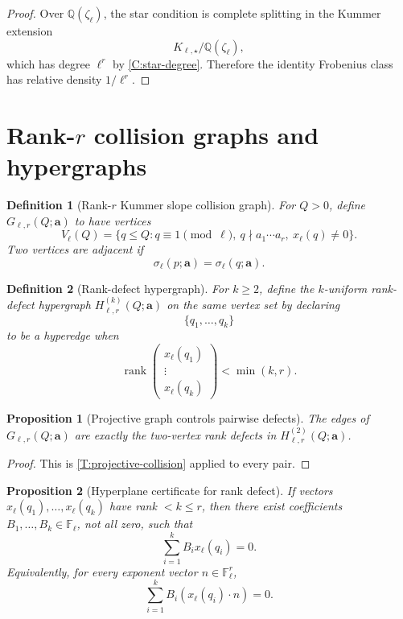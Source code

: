 \documentclass[11pt]{article}
\newtheorem{proposition}{Proposition}
\newtheorem{definition}{Definition}
\newcommand{\Q}{\mathbb Q}
\newcommand{\F}{\mathbb F}
\newcommand{\rank}{\operatorname{rank}}
\begin{document}
\begin{proof}
Over \(\Q(\zeta_\ell)\), the star condition is complete splitting in the Kummer extension
\[
K_{\ell,\star}/\Q(\zeta_\ell),
\]
which has degree \(\ell^r\) by \cref{C:star-degree}.  Therefore the identity Frobenius class has relative density \(1/\ell^r\).
\end{proof}

\section{Rank-\(r\) collision graphs and hypergraphs}

\begin{definition}[Rank-\(r\) Kummer slope collision graph]\label{D:rankr-graph}
For \(Q>0\), define \(G_{\ell,r}(Q;\mathbf a)\) to have vertices
\[
V_{\ell}(Q)=\{q\le Q:q\equiv1\pmod\ell,\ q\nmid a_1\cdots a_r,\ x_\ell(q)\ne0\}.
\]
Two vertices are adjacent if
\[
\sigma_\ell(p;\mathbf a)=\sigma_\ell(q;\mathbf a).
\]
\end{definition}

\begin{definition}[Rank-defect hypergraph]\label{D:rank-hypergraph}
For \(k\ge2\), define the \(k\)-uniform rank-defect hypergraph \(H_{\ell,r}^{(k)}(Q;\mathbf a)\) on the same vertex set by declaring
\[
\{q_1,\ldots,q_k\}
\]
to be a hyperedge when
\[
\rank
\begin{pmatrix}
x_\ell(q_1)\\
\vdots\\
x_\ell(q_k)
\end{pmatrix}
<\min(k,r).
\]
\end{definition}

\begin{proposition}[Projective graph controls pairwise defects]\label{P:graph-controls}
The edges of \(G_{\ell,r}(Q;\mathbf a)\) are exactly the two-vertex rank defects in \(H_{\ell,r}^{(2)}(Q;\mathbf a)\).
\end{proposition}

\begin{proof}
This is \cref{T:projective-collision} applied to every pair.
\end{proof}

\begin{proposition}[Hyperplane certificate for rank defect]\label{P:hyperplane-certificate}
If vectors \(x_\ell(q_1),\ldots,x_\ell(q_k)\) have rank \(<k\le r\), then there exist coefficients \(B_1,\ldots,B_k\in\F_\ell\), not all zero, such that
\[
\sum_{i=1}^k B_i x_\ell(q_i)=0.
\]
Equivalently, for every exponent vector \(n\in\F_\ell^r\),
\[
\sum_{i=1}^k B_i (x_\ell(q_i)\cdot n)=0.
\]
\end{proposition}
\end{document}
